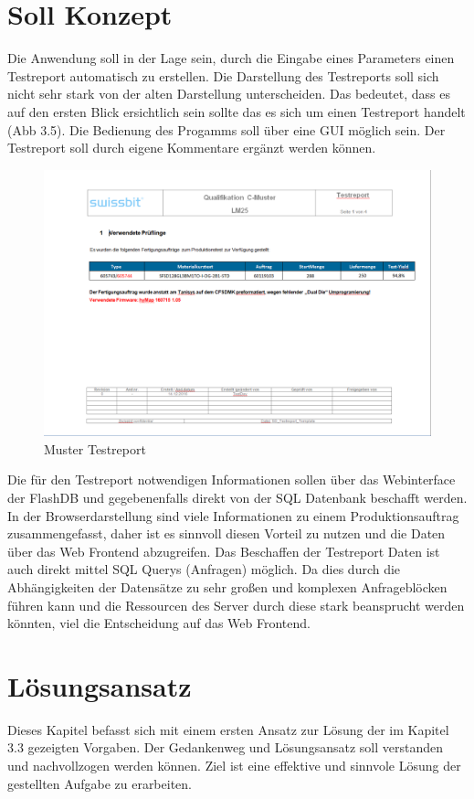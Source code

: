 \section{Soll Konzept}
Die Anwendung soll in der Lage sein, durch die Eingabe eines Parameters einen Testreport automatisch zu erstellen. Die Darstellung des Testreports soll sich nicht sehr stark von der alten Darstellung unterscheiden. Das bedeutet, dass es auf den ersten Blick ersichtlich sein sollte das es sich um einen Testreport handelt (Abb 3.5). Die Bedienung des Progamms soll über eine \ac{GUI} möglich sein. Der Testreport soll durch eigene Kommentare ergänzt werden können.
\begin{figure}[!htbp]
\centering
\includegraphics[scale=0.35]{images/testreport01}
\caption{Muster Testreport}
\label{fig:Testreport Muster}
\end{figure}

Die für den Testreport notwendigen Informationen sollen über das Webinterface der FlashDB und gegebenenfalls direkt von der \ac{SQL} Datenbank beschafft werden. In der Browserdarstellung sind viele Informationen zu einem Produktionsauftrag zusammengefasst, daher ist es sinnvoll diesen Vorteil zu nutzen und die Daten über das Web Frontend abzugreifen. Das Beschaffen der Testreport Daten ist auch direkt mittel \ac{SQL} Querys (Anfragen) möglich. Da dies durch die Abhängigkeiten der Datensätze zu sehr großen und komplexen Anfrageblöcken führen kann und die Ressourcen des Server durch diese stark beansprucht werden könnten, viel die Entscheidung auf das Web Frontend.
\newpage

\section{Lösungsansatz}
Dieses Kapitel befasst sich mit einem ersten Ansatz zur Lösung der im Kapitel 3.3 gezeigten Vorgaben. Der Gedankenweg und Lösungsansatz soll verstanden und nachvollzogen werden können. Ziel ist eine effektive und sinnvole Lösung der gestellten Aufgabe zu erarbeiten.

